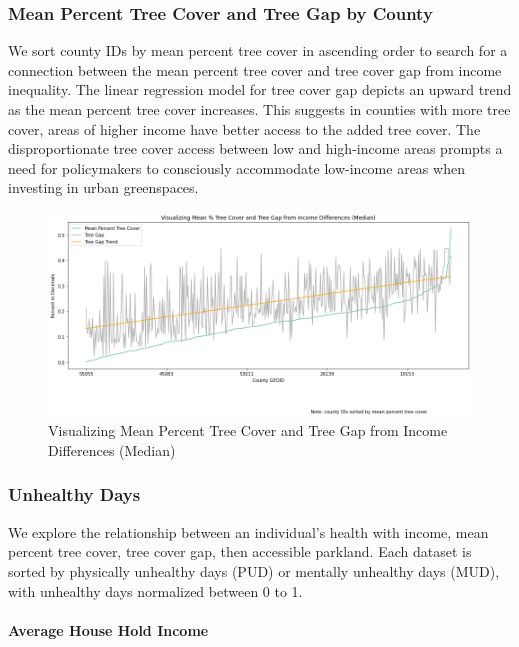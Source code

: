 \documentclass{article}
\begin{document}
\subsubsection{Mean Percent Tree Cover and Tree Gap by County}
We sort county IDs by mean percent tree cover in ascending order to search for a connection between the mean percent tree cover and tree cover gap from income inequality. The linear regression model for tree cover gap depicts an upward trend as the mean percent tree cover increases. This suggests in counties with more tree cover, areas of higher income have better access to the added tree cover. The disproportionate tree cover access between low and high-income areas prompts a need for policymakers to consciously accommodate low-income areas when investing in urban greenspaces.

\begin{figure}[H]
    \centering
    \includegraphics[scale = 0.4]{mean_pecent_tree_cover_tree_gap.png}
    \caption{Visualizing Mean Percent Tree Cover and Tree Gap from Income Differences (Median)}
    \label{fig:my_label}
\end{figure}

\subsubsection{Unhealthy Days}
We explore the relationship between an individual’s health with income, mean percent tree cover, tree cover gap, then accessible parkland. Each dataset is sorted by physically unhealthy days (PUD) or mentally unhealthy days (MUD), with unhealthy days normalized between 0 to 1. 

\setcounter{secnumdepth}{4}
\paragraph{Average House Hold Income}
\end{document}
